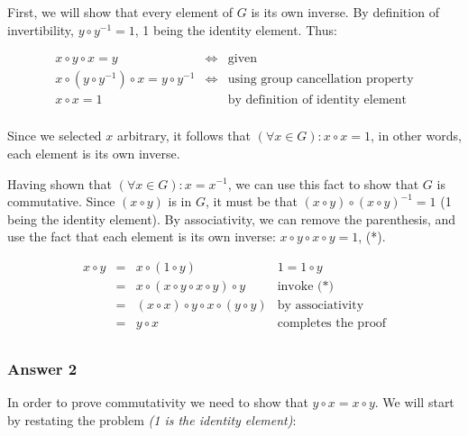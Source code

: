 \documentclass[11pt]{article}
\begin{document}
First, we will show that every element of $G$ is its own inverse.  By definition of
invertibility, $y \circ y^{-1} = 1$, 1 being the identity element.  Thus:

\begin{equation*}
  \begin{array}{lll}
    x \circ y \circ x = y & \iff &
    \textrm{given} \\
    x \circ (y \circ y^{-1}) \circ x = y \circ y^{-1} & \iff &
    \textrm{using group cancellation property} \\
    x \circ x = 1 & &
    \textrm{by definition of identity element} \\
  \end{array}
\end{equation*}

Since we selected $x$ arbitrary, it follows that
$(\forall x \in G): x \circ x = 1$, in other words, each element is its own inverse.

Having shown that $(\forall x \in G): x = x^{-1}$, we can use this fact to show that
$G$ is commutative.  Since $(x \circ y)$ is in $G$, it must be that
$(x \circ y) \circ (x \circ y)^{-1} = 1$ (1 being the identity element).  By
associativity, we can remove the parenthesis, and use the fact that each element
is its own inverse: $x \circ y \circ x \circ y = 1$, (*).

\begin{equation*}
  \begin{array}{llll}
    x \circ y & = & x \circ (1 \circ y)                           & \textrm{$1 = 1 \circ y$} \\
              & = & x \circ (x \circ y \circ x \circ y) \circ y   & \textrm{invoke (*)} \\
              & = & (x \circ x) \circ y \circ x \circ (y \circ y) & \textrm{by associativity} \\
              & = & y \circ x                                     & \textrm{completes the proof} \\
  \end{array}
\end{equation*}
\subsubsection{Answer 2}
\label{sec-1-1-2}

In order to prove commutativity we need to show that $y \circ x = x \circ y$.
We will start by restating the problem \emph{(1 is the identity element)}:
\end{document}
